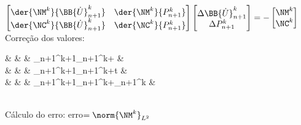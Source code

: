 \begin{algorithm}[h!]
{{            $\begin{bmatrix}
                    \der{\NM^k}{\BB{\dot{U}}_{n+1}^k} & \der{\NM^k}{P_{n+1}^k} \\
                    \der{\NC^k}{\BB{\dot{U}}_{n+1}^k} & \der{\NC^k}{P_{n+1}^k}
                \end{bmatrix}
                \begin{bmatrix}
                    \Delta\BB{\dot{U}}_{n+1}^k \\\Delta P_{n+1}^k
                \end{bmatrix}=-
                \begin{bmatrix}
                    \NM^k \\\NC^k
                \end{bmatrix}$\\
            Correção dos valores:
            \begin{flalign*}
                 &   &  & _{n+1}^{k+1}\gets{}_{n+1}^k+\Delta{} & \\
                 &  &  & _{n+1}^{k+1}\gets{}_{n+1}^k+\gamma\Delta t\Delta{}     & \\
                 &     &  & _{n+1}^{k+1}\gets{}_{n+1}^k+\Delta{}_{n+1}^k                   &
            \end{flalign*}\\
            Cálculo do erro: erro$=\norm{\NM^k}_{L^2}$
        }
    }
\end{algorithm}